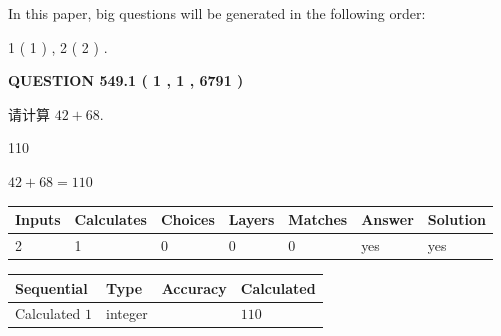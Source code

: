 \documentclass{ctexart}
\begin{document}
In this paper, big questions will be generated in the following order: 
   
   
   1 ( 1 )
 ,
   2 ( 2 )
 .
  
\vspace{0.2in}
  
{\textbf{\Large{QUESTION
549.1 
 ( 1 , 1 , 6791 )
}}}
  
  
 
请计算 $ %
42 +  %
68 $.
 
 
 
\noindent{}
 
 

110
 
 
\noindent{}
 
 

 
 
 
\noindent{}
 
 

$ %
42 +  %
68=   %
110$
 
 
\noindent{}
 
 

 
   
   
   
   
\noindent\begin{tabular}{|l|l|l|l|l|l|l|}
 \hline
Inputs & Calculates & Choices & Layers & Matches & Answer & Solution \\ \hline
 2  & 
 1  & 
 0
  & 
 0  & 
 0  & 
  yes & 
  yes 
  \\ \hline
 \end{tabular}
   
   
   
   
\noindent{}
   
   
  
  
\noindent\begin{tabular}{|l|l|l|l|}
\hline
 Sequential & Type & Accuracy & Calculated \\ 
\hline
 
 
  Calculated $  1 $ & integer &  & 
  $ 110 $ 
 \\  \hline  
 \end{tabular}
   
\end{document}
